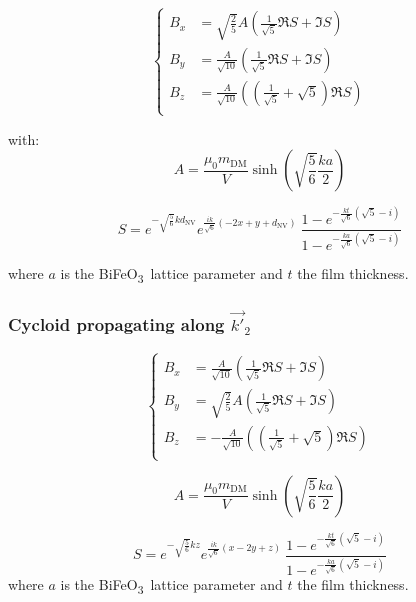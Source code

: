 \documentclass[a4paper,12pt]{article}
\newcommand{\BFO}{BiFeO\textsubscript{3}\ }
\begin{document}
\begin{equation*}
    \left \lbrace
      \begin{aligned}
        B_x & = \sqrt{\frac{2}{5}} A \left(  \frac{1}{\sqrt{5}} \Re{S}+
          \Im{S} \right)\\
        B_y &=   \frac{A}{\sqrt{10}} \left(  \frac{1}{\sqrt{5}} \Re{S}
          +\Im{S} \right) \\
        B_z & =  \frac{A}{\sqrt{10}} \left(  (\frac{1}{\sqrt{5}}+\sqrt{5}) \Re{S} \right)
         \\
      \end{aligned}
    \right.
  \end{equation*}

  \vspace*{5mm}

  \clearpage
  with:
  \[ A = \frac{\mu_0 m_\text{DM}}{V}\sinh(\sqrt{\frac{5}{6}} \frac{ka}{2}) \]

  \[ S = e^{-\sqrt{\frac{5}{6}}kd_\text{NV}} e^{\frac{ik}{\sqrt{6}}(-2x+y+d_\text{NV})}   \        \frac{1-e^{-\frac{kt}{\sqrt{6}}(\sqrt{5}-i)}}{1-e^{-\frac{ka}{\sqrt{6}}(\sqrt{5}-i)}} \]

  where $a$ is the \BFO lattice parameter and $t$ the film thickness.


  \subsubsection{Cycloid propagating along $\vec{k'}_2$}

  \begin{equation*}
    \left \lbrace
      \begin{aligned}
        B_x & =  \frac{A}{\sqrt{10}} \left( \frac{1}{\sqrt{5}}
          \Re{S}+\Im{S} \right)\\
        B_y &=  \sqrt{\frac{2}{5}} A  \left(  \frac{1}{\sqrt{5}} \Re{S}
          + \Im{S} \right) \\
        B_z & = - \frac{A}{\sqrt{10}} \left(  (\frac{1}{\sqrt{5}}+\sqrt{5}) \Re{S} \right)\\
      \end{aligned}
    \right.
  \end{equation*}

  \vspace*{5mm}

  \[A = \frac{\mu_0 m_\text{DM}}{V}\sinh(\sqrt{\frac{5}{6}} \frac{ka}{2})\]

  \[S = e^{-\sqrt{\frac{5}{6}}kz} e^{\frac{ik}{\sqrt{6}}(x-2y+z)}   \        \frac{1-e^{-\frac{kt}{\sqrt{6}}(\sqrt{5}-i)}}{1-e^{-\frac{ka}{\sqrt{6}}(\sqrt{5}-i)}}\]
  where $a$ is the \BFO lattice parameter and $t$ the film thickness.
\end{document}

